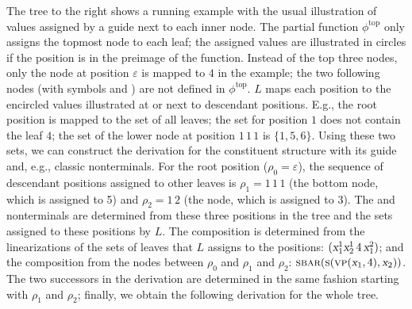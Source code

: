 \documentclass[../../document.tex]{subfiles}
\begin{document}
    \begin{wrapfigure}[8]{r}{0pt}
        
    \end{wrapfigure}
    \parexample\label{ex:extraction:head}
    The tree to the right shows a running example with the usual illustration of values assigned by a guide next to each inner node.
    The partial function \(\phi^{\text{top}}\) only assigns the topmost node to each leaf; the assigned values are illustrated in circles if the position is in the preimage of the function.
    Instead of the top three nodes, only the  node at position \(\varepsilon\) is mapped to \(4\) in the example; the two following nodes (with symbols  and ) are not defined in \(\phi^{\text{top}}\).
    \(L\) maps each position to the encircled values illustrated at or next to descendant positions.
    E.g., the root position is mapped to the set of all leaves;
      the set for position \(1\) does not contain the leaf $4$;
      the set of the lower  node at position \(1\,1\,1\) is \(\{1,5,6\}\).
    Using these two sets, we can construct the derivation for the constituent structure with its guide and, e.g., classic nonterminals.
    For the root position (\(\rho_0 = \varepsilon\)), the sequence of descendant positions assigned to other leaves is \(\rho_1 = 1\,1\,1\) (the bottom  node, which is assigned to 5) and \(\rho_2 = 1\,2\) (the  node, which is assigned to 3).
    The  and  nonterminals are determined from these three positions in the tree and the sets assigned to these positions by \(L\).
    The  composition is determined from the linearizations of the sets of leaves that \(L\) assigns to the positions: \((\textsl{x}_1^1\textsl{x}_2^1\,4\,\textsl{x}_1^2)\); and the  composition from the nodes between \(\rho_0\) and \(\rho_1\) and \(\rho_2\): \(\textsc{sbar}(\textsc{s}(\textsc{vp}(\textsl{x}_1, 4), \textsl{x}_2))\).
    The two successors in the derivation are determined in the same fashion starting with \(\rho_1\) and \(\rho_2\); finally, we obtain the following derivation for the whole tree.
    \begin{center}
        
    \end{center}
    \exampleqed
\end{document}
